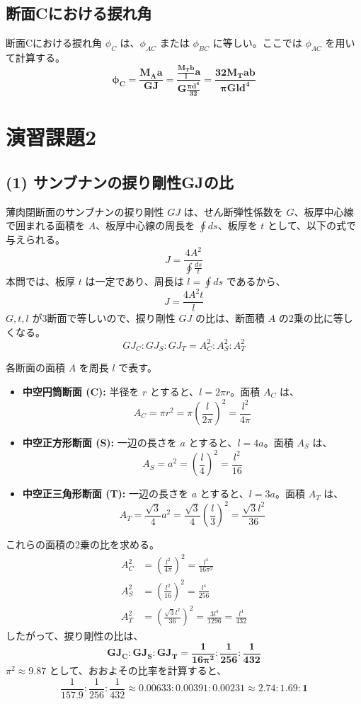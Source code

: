\documentclass[a4j,12pt]{jsarticle}
\begin{document}
\subsection*{断面Cにおける捩れ角}
断面Cにおける捩れ角 $\phi_C$ は、$\phi_{AC}$ または $\phi_{BC}$ に等しい。ここでは $\phi_{AC}$ を用いて計算する。
$$\boldsymbol{\phi_C = \frac{M_A a}{GJ} = \frac{\frac{M_T b}{l} a}{G \frac{\pi d^4}{32}} = \frac{32 M_T ab}{\pi G l d^4}}$$

\newpage
\section*{演習課題2}
\subsection*{(1) サンブナンの捩り剛性GJの比}
薄肉閉断面のサンブナンの捩り剛性 $GJ$ は、せん断弾性係数を $G$、板厚中心線で囲まれる面積を $A$、板厚中心線の周長を $\oint ds$、板厚を $t$ として、以下の式で与えられる。
$$J = \frac{4A^2}{\oint \frac{ds}{t}}$$
本問では、板厚 $t$ は一定であり、周長は $l = \oint ds$ であるから、
$$J = \frac{4A^2 t}{l}$$
$G, t, l$ が3断面で等しいので、捩り剛性 $GJ$ の比は、断面積 $A$ の2乗の比に等しくなる。
$$GJ_C : GJ_S : GJ_T = A_C^2 : A_S^2 : A_T^2$$

各断面の面積 $A$ を周長 $l$ で表す。
\begin{itemize}
    \item \textbf{中空円筒断面 (C):}
    半径を $r$ とすると、$l = 2\pi r$。面積 $A_C$ は、
    $$A_C = \pi r^2 = \pi \left(\frac{l}{2\pi}\right)^2 = \frac{l^2}{4\pi}$$

    \item \textbf{中空正方形断面 (S):}
    一辺の長さを $a$ とすると、$l = 4a$。面積 $A_S$ は、
    $$A_S = a^2 = \left(\frac{l}{4}\right)^2 = \frac{l^2}{16}$$

    \item \textbf{中空正三角形断面 (T):}
    一辺の長さを $a$ とすると、$l = 3a$。面積 $A_T$ は、
    $$A_T = \frac{\sqrt{3}}{4} a^2 = \frac{\sqrt{3}}{4} \left(\frac{l}{3}\right)^2 = \frac{\sqrt{3}l^2}{36}$$
\end{itemize}
これらの面積の2乗の比を求める。
\begin{align*}
    A_C^2 &= \left(\frac{l^2}{4\pi}\right)^2 = \frac{l^4}{16\pi^2} \\
    A_S^2 &= \left(\frac{l^2}{16}\right)^2 = \frac{l^4}{256} \\
    A_T^2 &= \left(\frac{\sqrt{3}l^2}{36}\right)^2 = \frac{3l^4}{1296} = \frac{l^4}{432}
\end{align*}
したがって、捩り剛性の比は、
$$\boldsymbol{GJ_C : GJ_S : GJ_T = \frac{1}{16\pi^2} : \frac{1}{256} : \frac{1}{432}}$$
$\pi^2 \approx 9.87$ として、おおよその比率を計算すると、
$$\frac{1}{157.9} : \frac{1}{256} : \frac{1}{432} \approx 0.00633 : 0.00391 : 0.00231 \approx \boldsymbol{2.74 : 1.69 : 1}$$
\end{document}
